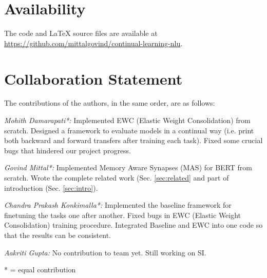 \documentclass[11pt,a4paper]{article}
\begin{document}
\section*{Availability}
The code and \LaTeX{} source files are available at \url{https://github.com/mittalgovind/continual-learning-nlu}.


\section*{Collaboration Statement}
The contributions of the authors, in the same order, are as follows:

\textit{Mohith Damarapati*:} Implemented EWC (Elastic Weight Consolidation) from scratch.  Designed a framework to evaluate models in a continual way (i.e. print both backward and forward transfers after training each task).  Fixed some crucial bugs that hindered our project progress. 

\textit{Govind Mittal*:} Implemented Memory Aware Synapses (MAS) for BERT from scratch. Wrote the complete related work (Sec. \ref{sec:related} and part of introduction (Sec. \ref{sec:intro}). 

\textit{Chandra Prakash Konkimalla*:} Implemented the baseline framework for finetuning the tasks one after another. Fixed bugs in EWC (Elastic Weight Consolidation) training procedure. Integrated Baseline and EWC into one code so that the results can be consistent. 

\textit{Aakriti Gupta:} No contribution to team yet. Still working on SI.

* = equal contribution




\end{document}
